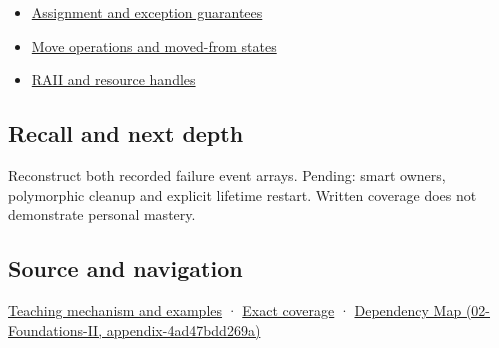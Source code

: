 \begin{itemize}
\tightlist
\item
  \hyperref[appendix-bea6beb5350f]{Assignment and exception guarantees}
\item
  \hyperref[appendix-5636651017c2]{Move operations and moved-from states}
\item
  \hyperref[appendix-69739d3ab49b]{RAII and resource handles}
\end{itemize}

\subsection{Recall and next depth}\label{recall-and-next-depth}

Reconstruct both recorded failure event arrays. Pending: smart owners, polymorphic cleanup and explicit lifetime restart. Written coverage does not demonstrate personal mastery.

\subsection{Source and navigation}\label{source-and-navigation}

\href{Continuous\%20Notes/Computing\%20Foundations\%20-\%20From\%20Bits\%20to\%20C++\%20and\%20Systems\%20APIs\#Destruction\%20closes\%20the\%20ownership\%20interval}{Teaching mechanism and examples} · \hyperref[appendix-fd090d982a15]{Exact coverage} · \href{}{Dependency Map (02-Foundations-II, appendix-4ad47bdd269a)}
